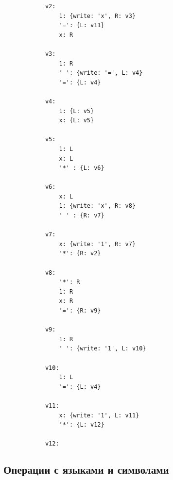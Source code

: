 \documentclass{article}
\begin{document}
\begin{enumerate}
\begin{enumerate}
\begin{lstlisting}
            v2:
                1: {write: 'x', R: v3}
                '=': {L: v11}
                x: R
  
            v3:
                1: R
                ' ': {write: '=', L: v4}
                '=': {L: v4}
    
            v4:
                1: {L: v5}
                x: {L: v5}
    
            v5: 
                1: L
                x: L
                '*' : {L: v6}
    
            v6: 
                x: L
                1: {write: 'x', R: v8}
                ' ' : {R: v7}
  
            v7: 
                x: {write: '1', R: v7}
                '*': {R: v2}
  
            v8:
                '*': R
                1: R
                x: R
                '=': {R: v9}
  
            v9:
                1: R
                ' ': {write: '1', L: v10}
    
            v10:
                1: L
                '=': {L: v4}
    
            v11:
                x: {write: '1', L: v11}
                '*': {L: v12}
    
            v12:

            \end{lstlisting}
        \end{enumerate}
\end{enumerate}


\subsection{Операции с языками и символами}
\end{document}
